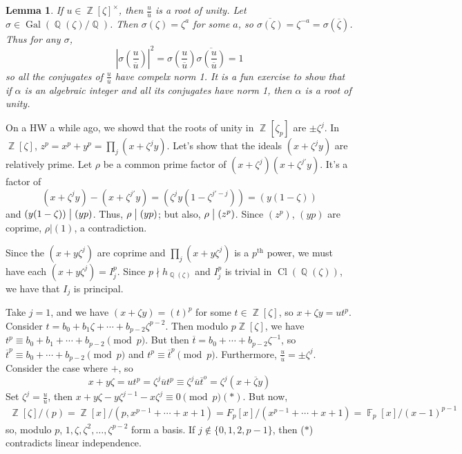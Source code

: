 \documentclass[11pt, a4paper]{memoir}
\DeclareMathOperator{\Q}{{\mathbb{Q}}}
\DeclareMathOperator{\Z}{{\mathbb{Z}}}
\DeclareMathOperator{\F}{{\mathbb{F}}}
\renewcommand{\div}{\bigm|}
\theoremstyle{change}
\newtheorem{lemma}[theorem]{Lemma}
\theoremstyle{plain}
\theoremstyle{nonumberplain}
\DeclareMathOperator{\Gal}{Gal}
\DeclareMathOperator{\Cl}{Cl}
\begin{document}
\begin{lemma}
    If $u\in\Z[\zeta]^\times$, then $\frac{u}{\overline{u}}$ is a root of unity.
    Let $\sigma\in\Gal(\Q(\zeta)/\Q)$.
    Then $\sigma(\zeta)=\zeta^a$ for some $a$, so $\overline{\sigma(\zeta)}=\zeta^{-a}=\sigma(\overline{\zeta})$.
    Thus for any $\sigma$,
    \begin{equation*}
        \left\lvert\sigma\left(\frac{u}{\overline{u}}\right)\right\rvert^2=\sigma\left(\frac{u}{\overline{u}}\right)\overline{\sigma\left(\frac{u}{\overline{u}}\right)}=1
    \end{equation*}
    so all the conjugates of $\frac{u}{\overline{u}}$ have compelx norm 1.
    It is a fun exercise to show that if $\alpha$ is an algebraic integer and all its conjugates have norm 1, then $\alpha$ is a root of unity.
\end{lemma}
On a HW a while ago, we showd that the roots of unity in $\Z[\zeta_p]$ are $\pm\zeta^j$.
In $\Z[\zeta]$, $z^p=x^p+y^p=\prod_j(x+\zeta^jy)$.
Let's show that the ideals $(x+\zeta^jy)$ are relatively prime.
Let $\rho$ be a common prime factor of $(x+\zeta^j)(x+\zeta^{j'}y)$.
It's a factor of
\begin{equation*}
    (x+\zeta^jy)-(x+\zeta^{j'}y)=\left(\zeta^jy(1-\zeta^{j'-j})\right)=(y(1-\zeta))
\end{equation*}
and $(y(1-\zeta))\div(yp)$.
Thus, $\rho\div(yp)$; but also, $\rho\div(z^p)$.
Since $(z^p)$, $(yp)$ are coprime, $\rho|(1)$, a contradiction.

Since the $(x+y\zeta^j)$ are coprime and $\prod_j(x+y\zeta^j)$ is a $p^\text{th}$ power, we must have each $(x+y\zeta^j)=I_j^p$.
Since $p\nmid h_{\Q(\zeta)}$ and $I_j^p$ is trivial in $\Cl(\Q(\zeta))$, we have that $I_j$ is principal.

Take $j=1$, and we have $(x+\zeta y)=(t)^p$ for some $t\in\Z[\zeta]$, so $x+\zeta y=ut^p$.
Consider $t=b_0+b_1\zeta+\cdots+b_{p-2}\zeta^{p-2}$.
Then modulo $p\Z[\zeta]$, we have $t^p\equiv b_0+b_1+\cdots+b_{p-2}\pmod{p}$.
But then $\overline{t}=b_0+\cdots+b_{p-2}\zeta^{-1}$, so $\overline{t}^p\equiv b_0+\cdots+b_{p-2}\pmod{p}$ and $t^p\equiv \overline{t}^p\pmod{p}$.
Furthermore, $\frac{u}{\overline{u}}=\pm\zeta^j$.
Consider the case where $+$, so
\begin{equation*}
    x+y\zeta=ut^p=\zeta^j\overline{u}t^p\equiv\zeta^j\overline{u}\overline{t}^o=\zeta^j(x+\overline{\zeta}y)
\end{equation*}
Set $\zeta^j=\frac{u}{\overline{u}}$, then $x+y\zeta-y\zeta^{j-1}-x\zeta^j\equiv 0\pmod{p} (*)$.
But now,
\begin{align*}
    \Z[\zeta]/(p) = \Z[x]/(p,x^{p-1}+\cdots+x+1) = F_p[x]/(x^{p-1}+\cdots+x+1)=\F_p[x]/(x-1)^{p-1}
\end{align*}
so, modulo $p$, $1,\zeta,\zeta^2,\ldots,\zeta^{p-2}$ form a basis.
If $j\notin\{0,1,2,p-1\}$, then ($*$) contradicts linear independence.
\end{document}
